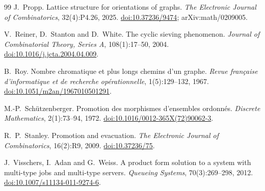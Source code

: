 \documentclass[11pt,a4paper]{article}
\theoremstyle{plain}
\theoremstyle{plain}
\begin{document}
\begin{thebibliography}{99}
J.~Propp.
Lattice structure for orientations of graphs.
\emph{The Electronic Journal of Combinatorics}, 32(4):P4.26, 2025.
\href{https://doi.org/10.37236/9474}{doi:10.37236/9474}; arXiv:math/0209005.

V.~Reiner, D.~Stanton and D.~White.
The cyclic sieving phenomenon.
\emph{Journal of Combinatorial Theory, Series A}, 108(1):17--50, 2004.
\href{https://doi.org/10.1016/j.jcta.2004.04.009}{doi:10.1016/j.jcta.2004.04.009}.

B.~Roy.
Nombre chromatique et plus longs chemins d'un graphe.
\emph{Revue fran\c{c}aise d'informatique et de recherche op\'erationnelle}, 1(5):129--132, 1967.
\href{https://doi.org/10.1051/m2an/1967010501291}{doi:10.1051/m2an/1967010501291}.

M.-P.~Sch\"utzenberger.
Promotion des morphismes d'ensembles ordonn\'es.
\emph{Discrete Mathematics}, 2(1):73--94, 1972.
\href{https://doi.org/10.1016/0012-365X(72)90062-3}{doi:10.1016/0012-365X(72)90062-3}.

R.~P.~Stanley.
Promotion and evacuation.
\emph{The Electronic Journal of Combinatorics}, 16(2):R9, 2009.
\href{https://doi.org/10.37236/75}{doi:10.37236/75}.

J.~Visschers, I.~Adan and G.~Weiss.
A product form solution to a system with multi-type jobs and multi-type servers.
\emph{Queueing Systems}, 70(3):269--298, 2012.
\href{https://doi.org/10.1007/s11134-011-9274-6}{doi:10.1007/s11134-011-9274-6}.

\end{thebibliography}
\end{document}
